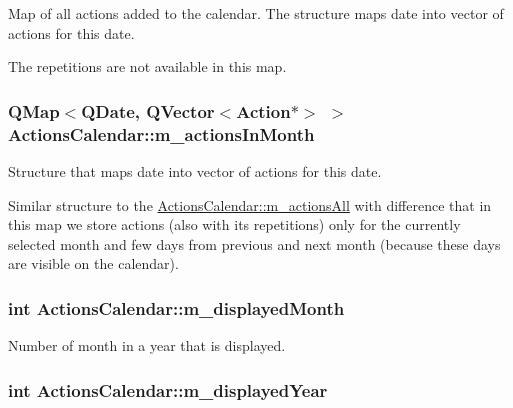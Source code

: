 Map of all actions added to the calendar. The structure maps date into vector of actions for this date. 

The repetitions are not available in this map. \hypertarget{class_actions_calendar_a82967fe853474c848bc2223e4c6985fa}{
\subsubsection[{m\-\_\-actions\-In\-Month}]{\setlength{\rightskip}{0pt plus 5cm}Q\-Map$<$Q\-Date, Q\-Vector$<${\bf Action}$\ast$$>$ $>$ Actions\-Calendar\-::m\-\_\-actions\-In\-Month\hspace{0.3cm}{\ttfamily [private]}}}\label{class_actions_calendar_a82967fe853474c848bc2223e4c6985fa}


Structure that maps date into vector of actions for this date. 

Similar structure to the \hyperlink{class_actions_calendar_af0f496503f8aff7dc3edbb0fdf3310b4}{Actions\-Calendar\-::m\-\_\-actions\-All} with difference that in this map we store actions (also with its repetitions) only for the currently selected month and few days from previous and next month (because these days are visible on the calendar). \hypertarget{class_actions_calendar_ae56427a30d84117a575881cce12a0df5}{
\subsubsection[{m\-\_\-displayed\-Month}]{\setlength{\rightskip}{0pt plus 5cm}int Actions\-Calendar\-::m\-\_\-displayed\-Month\hspace{0.3cm}{\ttfamily [private]}}}\label{class_actions_calendar_ae56427a30d84117a575881cce12a0df5}


Number of month in a year that is displayed. 

\hypertarget{class_actions_calendar_a547c91e076bb2e6749163ce7ea56676e}{
\subsubsection[{m\-\_\-displayed\-Year}]{\setlength{\rightskip}{0pt plus 5cm}int Actions\-Calendar\-::m\-\_\-displayed\-Year\hspace{0.3cm}{\ttfamily [private]}}}\label{class_actions_calendar_a547c91e076bb2e6749163ce7ea56676e}



